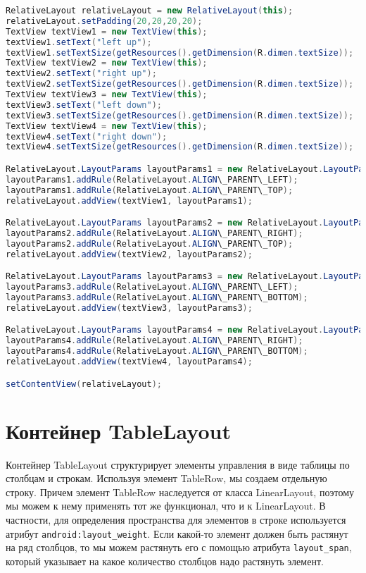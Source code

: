 \begin{lstlisting}[language=Java
	, caption=\leftline{Программное создание RelativeLayout}
	, label=RelativeLayout
	]
RelativeLayout relativeLayout = new RelativeLayout(this);
relativeLayout.setPadding(20,20,20,20);
TextView textView1 = new TextView(this);
textView1.setText("left up");
textView1.setTextSize(getResources().getDimension(R.dimen.textSize));
TextView textView2 = new TextView(this);
textView2.setText("right up");
textView2.setTextSize(getResources().getDimension(R.dimen.textSize));
TextView textView3 = new TextView(this);
textView3.setText("left down");
textView3.setTextSize(getResources().getDimension(R.dimen.textSize));
TextView textView4 = new TextView(this);
textView4.setText("right down");
textView4.setTextSize(getResources().getDimension(R.dimen.textSize));

RelativeLayout.LayoutParams layoutParams1 = new RelativeLayout.LayoutParams(ViewGroup.LayoutParams.WRAP\_CONTENT, ViewGroup.LayoutParams.WRAP\_CONTENT);
layoutParams1.addRule(RelativeLayout.ALIGN\_PARENT\_LEFT);
layoutParams1.addRule(RelativeLayout.ALIGN\_PARENT\_TOP);
relativeLayout.addView(textView1, layoutParams1);

RelativeLayout.LayoutParams layoutParams2 = new RelativeLayout.LayoutParams(ViewGroup.LayoutParams.WRAP\_CONTENT, ViewGroup.LayoutParams.WRAP\_CONTENT);
layoutParams2.addRule(RelativeLayout.ALIGN\_PARENT\_RIGHT);
layoutParams2.addRule(RelativeLayout.ALIGN\_PARENT\_TOP);
relativeLayout.addView(textView2, layoutParams2);

RelativeLayout.LayoutParams layoutParams3 = new RelativeLayout.LayoutParams(ViewGroup.LayoutParams.WRAP\_CONTENT, ViewGroup.LayoutParams.WRAP\_CONTENT);
layoutParams3.addRule(RelativeLayout.ALIGN\_PARENT\_LEFT);
layoutParams3.addRule(RelativeLayout.ALIGN\_PARENT\_BOTTOM);
relativeLayout.addView(textView3, layoutParams3);

RelativeLayout.LayoutParams layoutParams4 = new RelativeLayout.LayoutParams(ViewGroup.LayoutParams.WRAP\_CONTENT, ViewGroup.LayoutParams.WRAP\_CONTENT);
layoutParams4.addRule(RelativeLayout.ALIGN\_PARENT\_RIGHT);
layoutParams4.addRule(RelativeLayout.ALIGN\_PARENT\_BOTTOM);
relativeLayout.addView(textView4, layoutParams4);

setContentView(relativeLayout);
\end{lstlisting}

\section{Контейнер TableLayout}
Контейнер TableLayout структурирует элементы управления в виде 
таблицы по столбцам и строкам. Используя элемент TableRow, мы создаем 
отдельную строку. Причем элемент TableRow наследуется от класса 
LinearLayout, поэтому мы можем к нему применять тот же функционал, что и 
к LinearLayout. В частности, для определения пространства для элементов в 
строке используется атрибут \texttt{android:layout\_weight}.
Если какой-то элемент должен быть растянут на ряд столбцов, то мы можем
растянуть его с помощью атрибута \texttt{layout\_span}, который указывает
на какое количество столбцов надо растянуть элемент.

